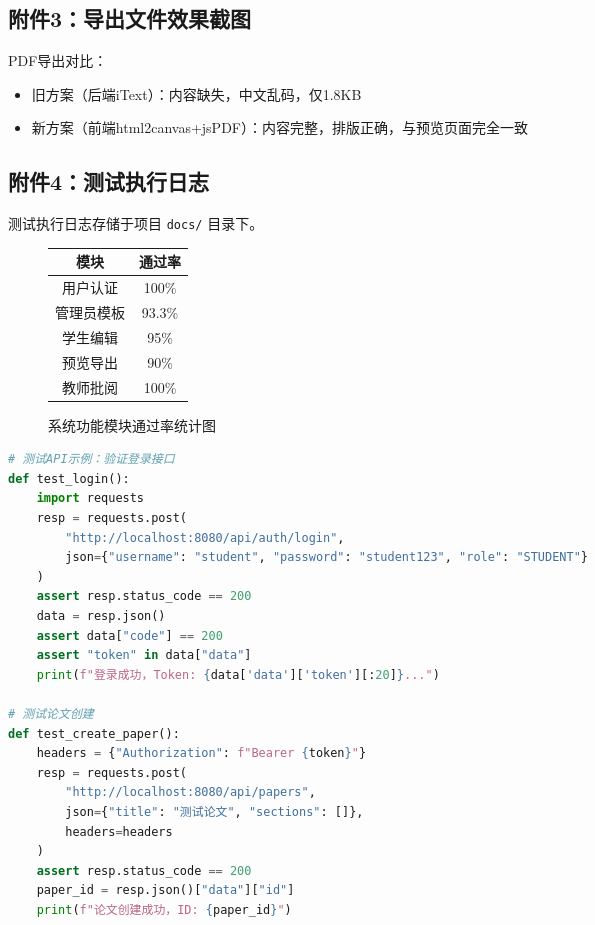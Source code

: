 \documentclass[a4paper,12pt]{article}
\begin{document}
\subsection{附件3：导出文件效果截图}

PDF导出对比：
\begin{itemize}
  \item 旧方案（后端iText）：内容缺失，中文乱码，仅1.8KB
  \item 新方案（前端html2canvas+jsPDF）：内容完整，排版正确，与预览页面完全一致
\end{itemize}

\subsection{附件4：测试执行日志}
测试执行日志存储于项目 \texttt{docs/} 目录下。

\begin{figure}[htbp]
    \centering
    \caption{系统功能模块通过率统计图}
    \vspace{2cm}
    \begin{minipage}{0.8\textwidth}
    \centering
    \begin{tabular}{|c|c|}
    \hline
    模块 & 通过率 \\
    \hline
    用户认证 & 100\% \\
    管理员模板 & 93.3\% \\
    学生编辑 & 95\% \\
    预览导出 & 90\% \\
    教师批阅 & 100\% \\
    \hline
    \end{tabular}
    \end{minipage}
\end{figure}

\begin{lstlisting}[language=Python, caption=自动化测试示例]
# 测试API示例：验证登录接口
def test_login():
    import requests
    resp = requests.post(
        "http://localhost:8080/api/auth/login",
        json={"username": "student", "password": "student123", "role": "STUDENT"}
    )
    assert resp.status_code == 200
    data = resp.json()
    assert data["code"] == 200
    assert "token" in data["data"]
    print(f"登录成功，Token: {data['data']['token'][:20]}...")

# 测试论文创建
def test_create_paper():
    headers = {"Authorization": f"Bearer {token}"}
    resp = requests.post(
        "http://localhost:8080/api/papers",
        json={"title": "测试论文", "sections": []},
        headers=headers
    )
    assert resp.status_code == 200
    paper_id = resp.json()["data"]["id"]
    print(f"论文创建成功，ID: {paper_id}")
\end{lstlisting}
\end{document}
